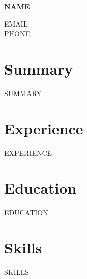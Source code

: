 \documentclass[10pt]{article}
\begin{document}
\textbf{\Large {{NAME}}}

{{EMAIL}} \\
{{PHONE}}

\section*{Summary}
{{SUMMARY}}

\section*{Experience}
{{EXPERIENCE}}

\section*{Education}
{{EDUCATION}}

\section*{Skills}
{{SKILLS}}
\end{document}
